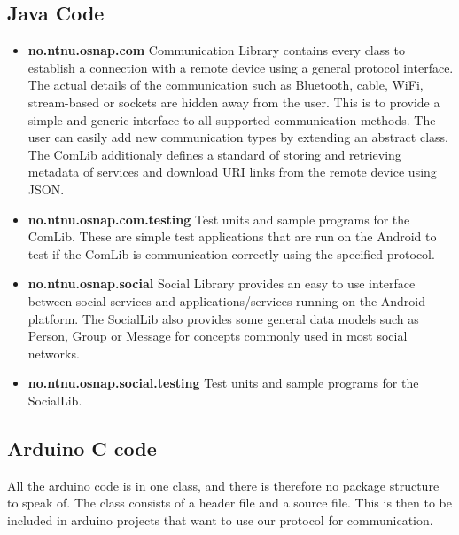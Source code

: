 \subsection{Java Code}
\begin{itemize}
	\item \textbf{no.ntnu.osnap.com}\newline
		Communication Library contains every class to establish a connection with a remote device using a general
		protocol interface. The actual details of the communication such as Bluetooth, cable, WiFi, stream-based or
		sockets are hidden away from the user. This is to provide a simple and generic interface to all supported
		communication methods. The user can easily add new communication types by extending an abstract class.
		The ComLib additionaly defines a standard of storing and retrieving metadata of services and download URI
		links from the remote device using JSON.
	\item \textbf{no.ntnu.osnap.com.testing}\newline
		Test units and sample programs for the ComLib. These are simple test applications that are run on
		the Android to test if the ComLib is communication correctly using the specified
		protocol.
	\item \textbf{no.ntnu.osnap.social}\newline
		Social Library provides an easy to use interface between social services and applications/services
		running on the Android platform. The SocialLib also provides some general data models such as Person,
		Group or Message for concepts commonly used in most social networks. 
	\item \textbf{no.ntnu.osnap.social.testing}  \newline
		Test units and sample programs for the SocialLib.
\end{itemize}

\subsection{Arduino C code}
All the arduino code is in one class, and there is therefore no package structure to speak of. The class consists of a header file and a source file. This is then to be included in arduino projects that want to use our protocol for communication.


